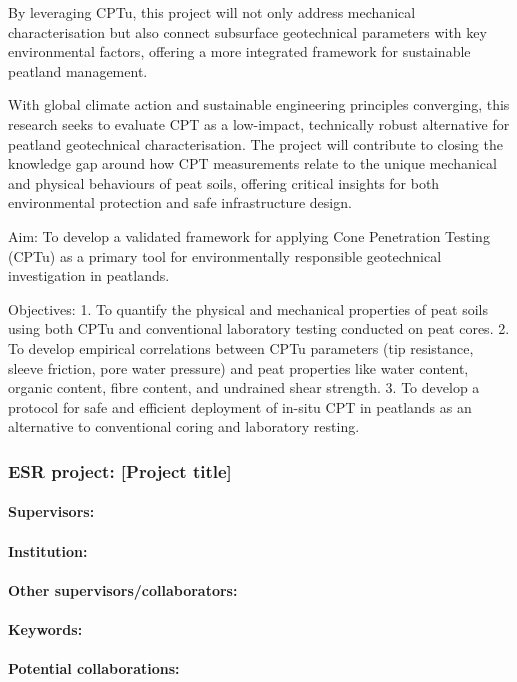 \documentclass[12pt]{article}
\begin{document}
By leveraging CPTu, this project will not only address mechanical characterisation but also connect subsurface geotechnical parameters with key environmental factors, offering a more integrated framework for sustainable peatland management.

With global climate action and sustainable engineering principles converging, this research seeks to evaluate CPT as a low-impact, technically robust alternative for peatland geotechnical characterisation. The project will contribute to closing the knowledge gap around how CPT measurements relate to the unique mechanical and physical behaviours of peat soils, offering critical insights for both environmental protection and safe infrastructure design.

Aim:
To develop a validated framework for applying Cone Penetration Testing (CPTu) as a primary tool for environmentally responsible geotechnical investigation in peatlands.

Objectives:
1.	To quantify the physical and mechanical properties of peat soils using both CPTu and conventional laboratory testing conducted on peat cores.
2.	To develop empirical correlations between CPTu parameters (tip resistance, sleeve friction, pore water pressure) and peat properties like water content, organic content, fibre content, and undrained shear strength.
3.	To develop a protocol for safe and efficient deployment of in-situ CPT in peatlands as an alternative to conventional coring and laboratory resting.


\subsubsection*{ESR project: [Project title]}
\paragraph{Supervisors:} 
\paragraph{Institution:} 
\paragraph{Other supervisors/collaborators:} 
\paragraph{Keywords:} 
\paragraph{Potential collaborations:} 
\end{document}
